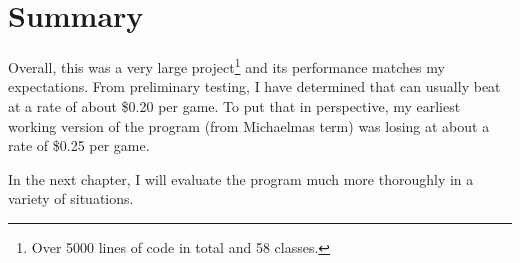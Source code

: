 



\section{Summary}								%



Overall, this was a very large project\footnote{Over 5000 lines of code in total and 58 classes.} and its performance matches my expectations. From preliminary testing, I have determined that \mbt can usually beat \sbt at a rate of about \$0.20 per game. To put that in perspective, my earliest working version of the program (from Michaelmas term) was losing at about a rate of \$0.25 per game. 

In the next chapter, I will evaluate the program much more thoroughly in a variety of situations. 

























